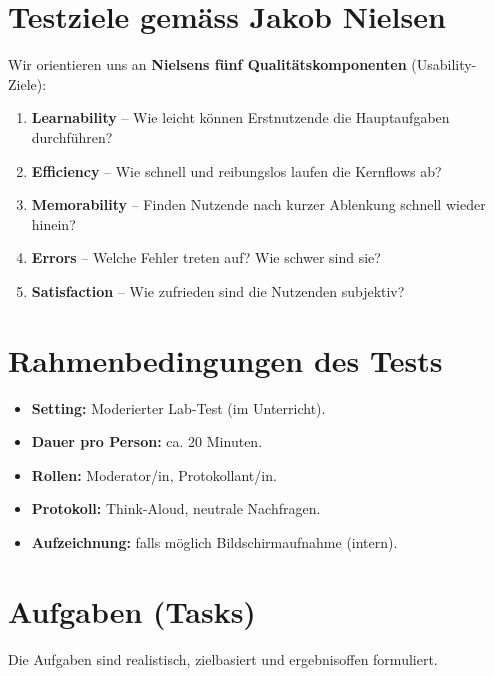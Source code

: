 \documentclass[11pt,a4paper]{article}
\begin{document}

\section{Testziele gemäss Jakob Nielsen}
Wir orientieren uns an \textbf{Nielsens fünf Qualitätskomponenten} (Usability-Ziele):

\begin{enumerate}
  \item \textbf{Learnability} – Wie leicht können Erstnutzende die Hauptaufgaben durchführen?
  \item \textbf{Efficiency} – Wie schnell und reibungslos laufen die Kernflows ab?
  \item \textbf{Memorability} – Finden Nutzende nach kurzer Ablenkung schnell wieder hinein?
  \item \textbf{Errors} – Welche Fehler treten auf? Wie schwer sind sie?
  \item \textbf{Satisfaction} – Wie zufrieden sind die Nutzenden subjektiv?
\end{enumerate}


\section{Rahmenbedingungen des Tests}
\begin{itemize}
  \item \textbf{Setting:} Moderierter Lab-Test (im Unterricht).
  \item \textbf{Dauer pro Person:} ca. 20 Minuten.
  \item \textbf{Rollen:} Moderator/in, Protokollant/in.
  \item \textbf{Protokoll:} Think-Aloud, neutrale Nachfragen.
  \item \textbf{Aufzeichnung:} falls möglich Bildschirmaufnahme (intern).
\end{itemize}


\section{Aufgaben (Tasks)}
Die Aufgaben sind realistisch, zielbasiert und ergebnisoffen formuliert.
\end{document}
